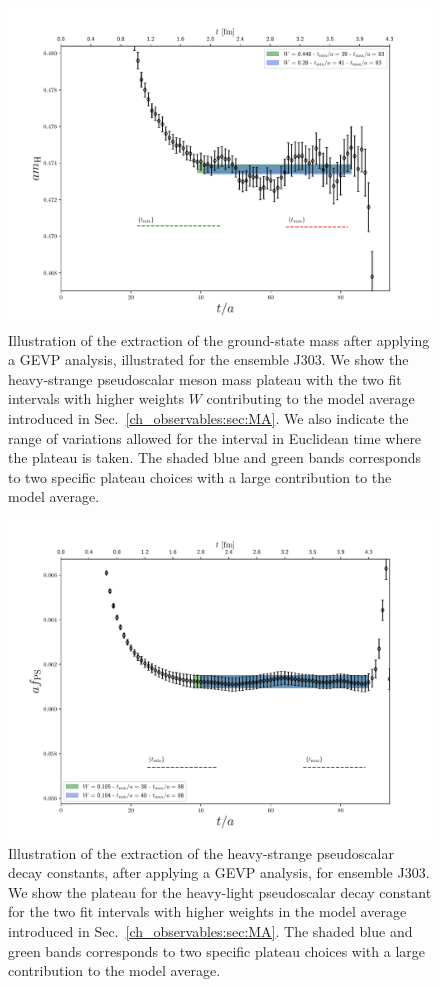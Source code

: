 \begin{figure}
  	\centering
  	\includegraphics[scale=0.5]{./cap6/figs/matching/m8_plateau.pdf}
  	\caption{Illustration of the extraction of the ground-state mass after applying a GEVP analysis, illustrated for the ensemble J303. We show the heavy-strange pseudoscalar meson mass plateau with the two fit intervals with higher weights $W$ contributing to the model average introduced in Sec.~\ref{ch_observables:sec:MA}. We also indicate the range of variations allowed for the interval in Euclidean time where the plateau is taken. The shaded blue and green bands corresponds to two specific plateau choices with a large contribution to the model average.} 
\label{fig:meff_plateau} 
\end{figure}

\begin{figure}
	\centering
	\includegraphics[scale=0.5]{./cap6/figs/fds/f8_plateau.pdf}
	\caption{Illustration of the extraction of the heavy-strange pseudoscalar decay constants, after applying a GEVP analysis, for ensemble J303. We show the plateau for the heavy-light pseudoscalar decay constant for the two fit intervals with higher weights in the model average introduced in Sec.~\ref{ch_observables:sec:MA}. The shaded blue and green bands corresponds to two specific plateau choices with a large contribution to the model average. }
	\label{fig:decay_plateau} 
\end{figure}